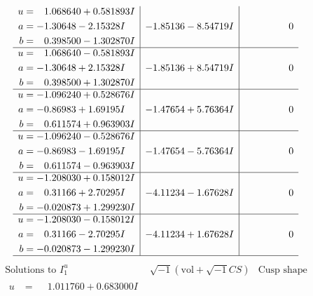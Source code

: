 \documentclass[1p]{elsarticle_modified}
\theoremstyle{definition}
\newcommand{\I}{\sqrt{-1}}
\begin{document}
$$\begin{array}{c|c|c}
\begin{aligned}
u &= \phantom{-}1.068640 + 0.581893 I \\
a &= -1.30648 - 2.15328 I \\
b &= \phantom{-}0.398500 - 1.302870 I\end{aligned}
 & -1.85136 - 8.54719 I & \phantom{-0.000000 } 0 \\ \hline\begin{aligned}
u &= \phantom{-}1.068640 - 0.581893 I \\
a &= -1.30648 + 2.15328 I \\
b &= \phantom{-}0.398500 + 1.302870 I\end{aligned}
 & -1.85136 + 8.54719 I & \phantom{-0.000000 } 0 \\ \hline\begin{aligned}
u &= -1.096240 + 0.528676 I \\
a &= -0.86983 + 1.69195 I \\
b &= \phantom{-}0.611574 + 0.963903 I\end{aligned}
 & -1.47654 + 5.76364 I & \phantom{-0.000000 } 0 \\ \hline\begin{aligned}
u &= -1.096240 - 0.528676 I \\
a &= -0.86983 - 1.69195 I \\
b &= \phantom{-}0.611574 - 0.963903 I\end{aligned}
 & -1.47654 - 5.76364 I & \phantom{-0.000000 } 0 \\ \hline\begin{aligned}
u &= -1.208030 + 0.158012 I \\
a &= \phantom{-}0.31166 + 2.70295 I \\
b &= -0.020873 + 1.299230 I\end{aligned}
 & -4.11234 - 1.67628 I & \phantom{-0.000000 } 0 \\ \hline\begin{aligned}
u &= -1.208030 - 0.158012 I \\
a &= \phantom{-}0.31166 - 2.70295 I \\
b &= -0.020873 - 1.299230 I\end{aligned}
 & -4.11234 + 1.67628 I & \phantom{-0.000000 } 0\\
 \hline 
 \end{array}$$\newpage$$\begin{array}{c|c|c}  
\text{Solutions to }I^u_{1}& \I (\text{vol} + \sqrt{-1}CS) & \text{Cusp shape}\\
 \hline 
\begin{aligned}
u &= \phantom{-}1.011760 + 0.683000 I \\

\end{aligned}
\end{array}$$
\end{document}
